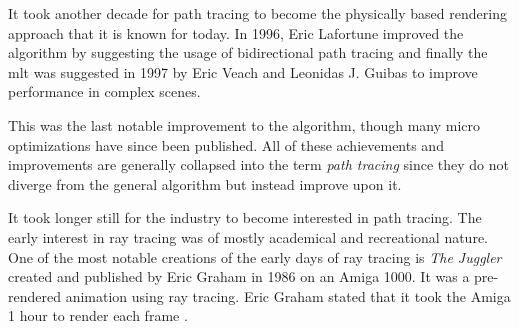 \documentclass[
  twoside,
  11pt, a4paper,
  footinclude=true,
  headinclude=true,
  cleardoublepage=empty
]{scrreprt}
\begin{document}
It took another decade for path tracing to become the
physically based rendering approach that it is known for today. In 1996, Eric Lafortune improved
the algorithm by suggesting the usage of bidirectional path tracing \cite{techreport:pbr} and
finally the \ac{mlt} was suggested in 1997 by Eric Veach and Leonidas J. Guibas \cite{inproceedings:metropolis} to
improve performance in complex scenes.

This was the last notable improvement to the algorithm,
though many micro optimizations \cite{caflisch1998monte}\cite{inproceedings:moller2005fast}\cite{site:cosine-weighted-hemisphere}\cite{site:better-sampling}
have since been published. All of these achievements and
improvements are generally collapsed into the term \emph{path tracing} since they do not diverge
from the general algorithm but instead improve upon it.

It took longer still for the industry to become interested in path tracing. The early interest in
ray tracing was of mostly academical and recreational nature. One of the most notable creations of
the early days of ray tracing is \emph{The Juggler} created and published by Eric Graham in 1986
\cite{site:juggler} on an Amiga 1000. It was a pre-rendered animation using ray tracing. Eric Graham
stated that it took the Amiga 1 hour to render each frame \cite{site:juggler}.
\end{document}
